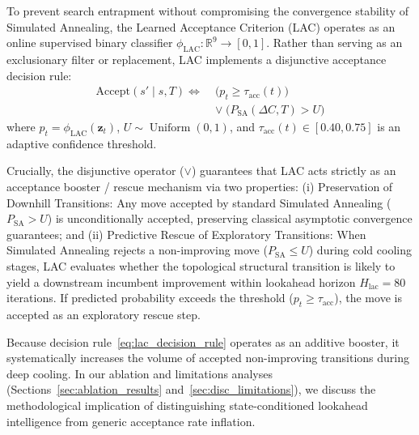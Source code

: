 \documentclass{ieeeaccess}
\begin{document}
To prevent search entrapment without compromising the convergence stability of Simulated Annealing, the Learned Acceptance Criterion (LAC) operates as an online supervised binary classifier $\phi_{\text{LAC}}: \mathbb{R}^9 \to [0, 1]$. Rather than serving as an exclusionary filter or replacement, LAC implements a disjunctive acceptance decision rule:
\begin{equation}
\begin{aligned}
  \text{Accept}(s' \mid s, T) \iff \; &\Big( p_t \ge \tau_{\text{acc}}(t) \Big) \\
  &\lor\; \Big( P_{\text{SA}}(\Delta C, T) > U \Big)
\end{aligned}
\label{eq:lac_decision_rule}
\end{equation}
where $p_t = \phi_{\text{LAC}}(\mathbf{z}_t)$, $U \sim \operatorname{Uniform}(0, 1)$, and $\tau_{\text{acc}}(t) \in [0.40, 0.75]$ is an adaptive confidence threshold. 

Crucially, the disjunctive operator ($\lor$) guarantees that LAC acts strictly as an acceptance booster / rescue mechanism via two properties: (i) Preservation of Downhill Transitions: Any move accepted by standard Simulated Annealing ($P_{\text{SA}} > U$) is unconditionally accepted, preserving classical asymptotic convergence guarantees; and (ii) Predictive Rescue of Exploratory Transitions: When Simulated Annealing rejects a non-improving move ($P_{\text{SA}} \le U$) during cold cooling stages, LAC evaluates whether the topological structural transition is likely to yield a downstream incumbent improvement within lookahead horizon $H_{\text{lac}} = 80$ iterations. If predicted probability exceeds the threshold ($p_t \ge \tau_{\text{acc}}$), the move is accepted as an exploratory rescue step.

Because decision rule~\eqref{eq:lac_decision_rule} operates as an additive booster, it systematically increases the volume of accepted non-improving transitions during deep cooling. In our ablation and limitations analyses (Sections~\ref{sec:ablation_results} and~\ref{sec:disc_limitations}), we discuss the methodological implication of distinguishing state-conditioned lookahead intelligence from generic acceptance rate inflation.
\end{document}
